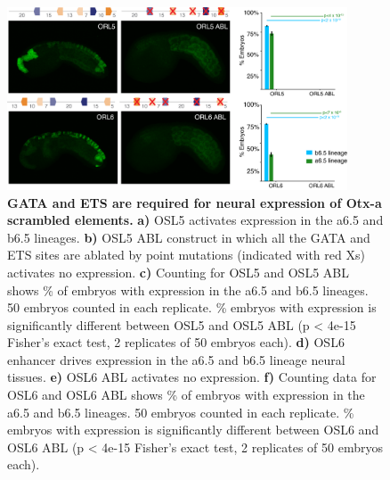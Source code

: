 \begin{figure}[p]
    \centering
    \includegraphics[width=0.9\textwidth]{2_figures-and-files/SuppFig4.png}
    \caption[GATA and ETS are required for neural expression of Otx-a scrambled elements.]{\textbf{GATA and ETS are required for neural expression of Otx-a scrambled elements.} \textbf{a)} OSL5 activates expression in the a6.5 and b6.5 lineages. \textbf{b)} OSL5 ABL construct in which all the GATA and ETS sites are ablated by point mutations (indicated with red Xs) activates no expression. \textbf{c)} Counting for OSL5 and OSL5 ABL shows \% of embryos with expression in the a6.5 and b6.5 lineages. 50 embryos counted in each replicate. \% embryos with expression is significantly different between OSL5 and OSL5 ABL (p < 4e-15 Fisher’s exact test, 2 replicates of 50 embryos each). \textbf{d)} OSL6 enhancer drives expression in the a6.5 and b6.5 lineage neural tissues. \textbf{e)} OSL6 ABL activates no expression. \textbf{f)} Counting data for OSL6 and OSL6 ABL shows \% of embryos with expression in the a6.5 and b6.5 lineages. 50 embryos counted in each replicate. \% embryos with expression is significantly different between OSL6 and OSL6 ABL (p < 4e-15 Fisher’s exact test, 2 replicates of 50 embryos each).}
    \label{fig:supplementary_4}
\end{figure}

